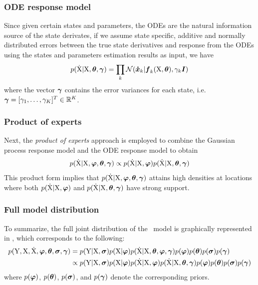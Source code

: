 \subsubsection*{ODE response model}

Since given certain states and parameters, the ODEs  are the natural information source of the state derivates, if we assume state specific, additive and normally distributed errors between the true state derivatives and response from the ODEs using the states and parameters estimation results as input, we have
\begin{align}
    p(\mathrm{\dot{X}}\vert\mathrm{X},\boldsymbol{\theta},\boldsymbol{\gamma}) 
    = \prod_k{
        \mathcal{N}(\boldsymbol{\dot{x}}_{k}\vert\boldsymbol{f}_{k}(\mathrm{X}, \boldsymbol{\theta}),\gamma_{k}\boldsymbol{I})
    }
    \label{eq-gmgp-dx-ode-response}
\end{align}
where the vector $\boldsymbol{\gamma}$ contains the error variances for each state, i.e.\ $\boldsymbol{\gamma} = [\gamma_{1},\dots,\gamma_{K}]^T \in \mathbb{R}^K$.

\subsubsection*{Product of experts}

Next, the \emph{product of experts} \citep{hinton1999products} approach is employed to combine the Gaussian process response model  and the ODE response model  to obtain
\begin{align}
    p(\mathrm{\dot{X}}\vert\mathrm{X},\boldsymbol{\varphi},\boldsymbol{\theta},\boldsymbol{\gamma})
    \propto p(\mathrm{\dot{X}}\vert\mathrm{X},\boldsymbol{\varphi}) p(\mathrm{\dot{X}}\vert\mathrm{X},\boldsymbol{\theta},\boldsymbol{\gamma}) 
    \label{eq-gmgp-poe}
\end{align}
This product form implies that $p(\mathrm{\dot{X}}\vert\mathrm{X},\boldsymbol{\varphi},\boldsymbol{\theta},\boldsymbol{\gamma})$ attains high densities at locations where both $p(\mathrm{\dot{X}}\vert\mathrm{X},\boldsymbol{\varphi})$ and $p(\mathrm{\dot{X}}\vert\mathrm{X},\boldsymbol{\theta},\boldsymbol{\gamma})$ have strong support.

\subsubsection*{Full model distribution}

To summarize, the full joint distribution of the \algogmgp\ model is graphically represented in , which corresponds to the following:
\begin{align}
    p(\mathrm{Y},\mathrm{X},\mathrm{\dot{X}},\boldsymbol{\varphi},\boldsymbol{\theta},\boldsymbol{\sigma},\boldsymbol{\gamma}) 
    & = p(\mathrm{Y}\vert\mathrm{X},\boldsymbol{\sigma}) p(\mathrm{X}\vert\boldsymbol{\varphi}) p(\mathrm{\dot{X}}\vert\mathrm{X},\boldsymbol{\theta},\boldsymbol{\varphi},\boldsymbol{\gamma}) p(\boldsymbol{\varphi}) p(\boldsymbol{\theta}) p(\boldsymbol{\sigma}) p(\boldsymbol{\gamma})   
    \nonumber
    \\
    & \propto
    p(\mathrm{Y}\vert\mathrm{X},\boldsymbol{\sigma}) p(\mathrm{X}\vert\boldsymbol{\varphi}) p(\mathrm{\dot{X}}\vert\mathrm{X},\boldsymbol{\varphi}) p(\mathrm{\dot{X}}\vert\mathrm{X},\boldsymbol{\theta},\boldsymbol{\gamma}) p(\boldsymbol{\varphi}) p(\boldsymbol{\theta}) p(\boldsymbol{\sigma}) p(\boldsymbol{\gamma})
    \nonumber
\end{align}
where $p(\boldsymbol{\varphi})$, $p(\boldsymbol{\theta})$, $p(\boldsymbol{\sigma})$, and $p(\boldsymbol{\gamma})$ denote the corresponding priors.

